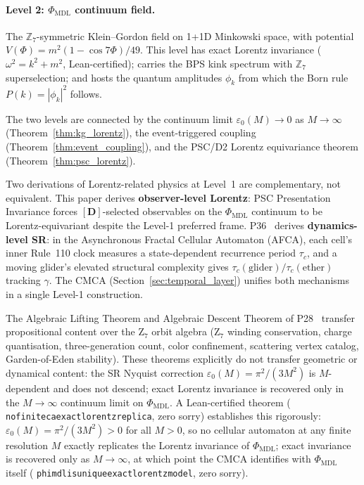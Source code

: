 \documentclass[11pt]{article}
\theoremstyle{remark}
\newcommand{\PHIMDL}{\Phi_{\mathrm{MDL}}}
\newcommand{\ZS}{\mathbb{Z}_7}
\newcommand{\lean}[1]{%
  \penalty-100
  \begingroup\def\_{\textunderscore\allowbreak}\texttt{#1}\endgroup}
\newcommand{\epsz}{\varepsilon_0}
\begin{document}
\paragraph{Level 2: $\PHIMDL$ continuum field.}
The $\ZS$-symmetric Klein--Gordon field on 1+1D Minkowski space, with
potential $V(\Phi)=m^2(1-\cos7\Phi)/49$.  This level has exact Lorentz
invariance ($\omega^2=k^2+m^2$, Lean-certified); carries the BPS kink
spectrum with $\ZS$ superselection; and hosts the quantum amplitudes
$\phi_k$ from which the Born rule $P(k)=|\phi_k|^2$ follows.

The two levels are connected by the continuum limit
$\epsz(M)\to0$ as $M\to\infty$ (Theorem~\ref{thm:kg_lorentz}),
the event-triggered coupling (Theorem~\ref{thm:event_coupling}),
and the PSC/D2 Lorentz equivariance theorem (Theorem~\ref{thm:psc_lorentz}).

Two derivations of Lorentz-related physics at Level~1 are complementary,
not equivalent.  This paper derives \textbf{observer-level Lorentz}: PSC
Presentation Invariance forces $[\mathbf{D}]$-selected observables on the
$\PHIMDL$ continuum to be Lorentz-equivariant despite the Level-1 preferred
frame.  P36~\cite{SpivackEmergentGravity} derives \textbf{dynamics-level SR}:
in the Asynchronous Fractal Cellular Automaton (AFCA), each cell's inner
Rule~110 clock measures a state-dependent recurrence period $\tau_c$, and a
moving glider's elevated structural complexity gives
$\tau_c(\text{glider})/\tau_c(\text{ether})$ tracking $\gamma$.
The CMCA (Section~\ref{sec:temporal_layer}) unifies both mechanisms in a
single Level-1 construction.

The Algebraic Lifting Theorem and Algebraic Descent Theorem of
P28~\cite{SpivackCompUniversality} transfer propositional content over the
Z$_7$ orbit algebra (Z$_7$ winding conservation, charge quantisation,
three-generation count, color confinement, scattering vertex catalog,
Garden-of-Eden stability).  These theorems explicitly do not transfer
geometric or dynamical content: the SR Nyquist correction
$\epsz(M)=\pi^2/(3M^2)$ is $M$-dependent and does not descend; exact Lorentz
invariance is recovered only in the $M\to\infty$ continuum limit on $\PHIMDL$.
A Lean-certified theorem (\lean{no\_finite\_ca\_exact\_lorentz\_replica}, zero sorry)
establishes this rigorously: $\epsz(M)=\pi^2/(3M^2)>0$ for all $M>0$, so no
cellular automaton at any finite resolution $M$ exactly replicates the Lorentz
invariance of $\PHIMDL$; exact invariance is recovered only as $M\to\infty$,
at which point the CMCA identifies with $\PHIMDL$ itself
(\lean{phimdl\_is\_unique\_exact\_lorentz\_model}, zero sorry).
\end{document}
